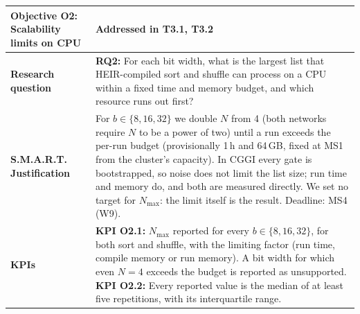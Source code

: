 \begin{table}[htbp]
\centering
\renewcommand{\arraystretch}{1.3}
\begin{tabularx}{\textwidth}{|p{}|L|}
\hline
\textbf{Objective O2: Scalability limits on CPU} & \textbf{Addressed in T3.1, T3.2} \\ \hline
\textbf{Research question} & \textbf{RQ2:} For each bit width, what is the largest list that HEIR-compiled sort and shuffle can process on a CPU within a fixed time and memory budget, and which resource runs out first? \\ \hline
\textbf{S.M.A.R.T. Justification} & For $b \in \{8, 16, 32\}$ we double $N$ from 4 (both networks require $N$ to be a power of two) until a run exceeds the per-run budget (provisionally 1\,h and 64\,GB, fixed at MS1 from the cluster's capacity). In CGGI every gate is bootstrapped, so noise does not limit the list size; run time and memory do, and both are measured directly. We set no target for $N_{\max}$: the limit itself is the result. Deadline: MS4 (W9). \\ \hline
\textbf{KPIs} & \textbf{KPI O2.1:} $N_{\max}$ reported for every $b \in \{8, 16, 32\}$, for both sort and shuffle, with the limiting factor (run time, compile memory or run memory). A bit width for which even $N=4$ exceeds the budget is reported as unsupported. \newline \textbf{KPI O2.2:} Every reported value is the median of at least five repetitions, with its interquartile range. \\ \hline
\end{tabularx}
\end{table}

